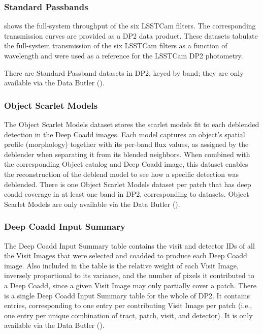 \subsubsection{Standard Passbands}
\label{sssec:std_passbands}
 shows the full-system throughput of the six \gls{LSSTCam} filters.
The corresponding transmission curves are provided as a \gls{DP2} data product.
These datasets tabulate the full-system transmission of the six \gls{LSSTCam} filters as a function of wavelength and were used as a reference for the \gls{LSSTCam} DP2 photometry.

There are \nstandardpassbands Standard Passband datasets in \gls{DP2}, keyed by band; they are only available via the Data \gls{Butler} ().

\subsubsection{Object Scarlet Models}
The \gls{Object} Scarlet Models dataset stores the scarlet models fit to each deblended detection in the Deep Coadd images.
Each model captures an object's spatial profile (morphology) together with its per-band \gls{flux} values, as assigned by the deblender when separating it from its blended neighbors.
When combined with the corresponding Object catalog and Deep Coadd image, this dataset enables the reconstruction of the \gls{deblend} model to see how a specific detection was deblended.
There is one Object Scarlet Models dataset per \gls{patch} that has deep coadd coverage in at least one band in DP2, corresponding to \nobjectscarletmodels datasets.
Object Scarlet Models are only available via the Data \gls{Butler} ().

\subsubsection{Deep Coadd Input Summary}
The Deep Coadd Input Summary table contains the visit and detector IDs of all the \gls{Visit} Images that were selected and coadded to produce each Deep Coadd image.
Also included in the table is the relative weight of each Visit Image, inversely proportional to its variance, and the number of pixels it contributed to a Deep Coadd, since a given Visit Image may only partially cover a \gls{patch}.
There is a single Deep Coadd Input Summary table for the whole of \gls{DP2}.
It contains \ndeepcoaddinputsummaryrows entries, corresponding to one entry per contributing Visit Image per \gls{patch} (i.e., one entry per unique combination of \gls{tract}, \gls{patch}, visit, and detector).
It is only available via the Data \gls{Butler} ().


